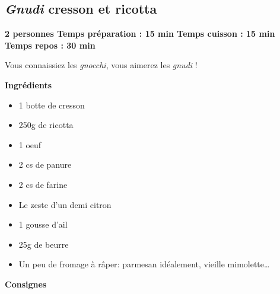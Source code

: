 \documentclass[]{book}
\providecommand{\tightlist}{%
  \setlength{\itemsep}{0pt}\setlength{\parskip}{0pt}}
\begin{document}
\hypertarget{gnudi-cresson-et-ricotta}{%
\subsection*{\texorpdfstring{{\emph{Gnudi} cresson et ricotta}}{Gnudi cresson et ricotta}}\label{gnudi-cresson-et-ricotta}}

\begin{salebox}
\textbf{2 personnes \textbar{} Temps préparation : 15 min \textbar{}
Temps cuisson : 15 min \textbar{} Temps repos : 30 min}

Vous connaissiez les \emph{gnocchi}, vous aimerez les \emph{gnudi} !
\end{salebox}

\textbf{Ingrédients}

\begin{itemize}
\tightlist
\item
  1 botte de cresson
\item
  250g de ricotta
\item
  1 oeuf
\item
  2 cs de panure
\item
  2 cs de farine
\item
  Le zeste d'un demi citron
\item
  1 gousse d'ail
\item
  25g de beurre
\item
  Un peu de fromage à râper: parmesan idéalement, vieille mimolette\ldots{}
\end{itemize}

\textbf{Consignes}
\end{document}
